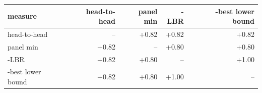 \begin{tabular}{lrrrr}
\toprule
measure & head-to-head & panel min & -LBR & -best lower bound \\
\midrule
head-to-head & -- & +0.82 & +0.82 & +0.82 \\
panel min & +0.82 & -- & +0.80 & +0.80 \\
-LBR & +0.82 & +0.80 & -- & +1.00 \\
-best lower bound & +0.82 & +0.80 & +1.00 & -- \\
\bottomrule
\end{tabular}
